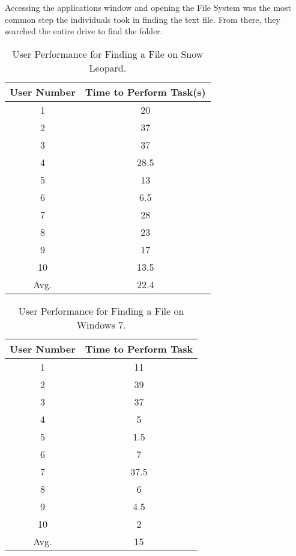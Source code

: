 \documentclass[11pt,letterpaper]{report}
\begin{document}
Accessing the applications window and opening the File System was the most common step the individuals took in finding the text file. From there, they searched the entire drive to find the folder. 

\begin{table}[h!]
    \centering
    \begin{tabular}{| c | c |}
        \hline
        User Number & Time to Perform Task(s) \\ \hline
        1 & 20 \\  \hline
        2 & 37 \\  \hline
        3 & 37 \\ \hline
        4 & 28.5 \\  \hline
        5 & 13 \\    \hline
        6 & 6.5 \\  \hline
        7 & 28 \\ \hline
        8 & 23 \\  \hline
        9 & 17 \\ \hline
        10 & 13.5 \\ \hline
        Avg. & 22.4 \\
        \hline
    \end{tabular}
    \caption{User Performance for Finding a File on Snow Leopard.}
    \label{fafM}
\end{table}

\begin{table}
    \centering
    \begin{tabular}{| c | c |}
        \hline
        User Number & Time to Perform Task \\ \hline
        1 & 11 \\  \hline
        2 & 39 \\  \hline
        3 & 37 \\ \hline
        4 & 5 \\  \hline
        5 & 1.5 \\    \hline
        6 & 7 \\  \hline
        7 & 37.5 \\ \hline
        8 & 6 \\  \hline
        9 & 4.5 \\ \hline
        10 & 2 \\ \hline
        Avg. & 15 \\
        \hline
    \end{tabular}
    \caption{User Performance for Finding a File on Windows 7.}
    \label{fafW}
\end{table}
\end{document}
